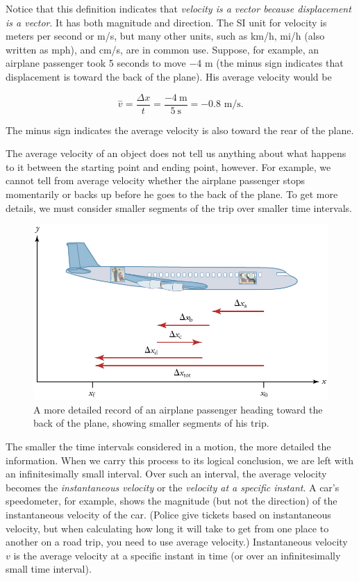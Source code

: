 \documentclass[
]{book}
\begin{document}
Notice that this definition indicates that \emph{velocity is a vector because
displacement is a vector}. It has both magnitude and direction. The SI
unit for velocity is meters per second or m/s, but many other units,
such as km/h, mi/h (also written as mph), and cm/s, are in common use.
Suppose, for example, an airplane passenger took 5 seconds to move −4 m
(the minus sign indicates that displacement is toward the back of the
plane). His average velocity would be

\leavevmode\hypertarget{import-auto-id4051374}{}%
\[{{{\overset{-}{v} = \frac{\Delta x}{t}} = \frac{- 4\ \text{m}}{5\ \text{s}}} = - \text{0.8\ m/s.}}{}\]

The minus sign indicates the average velocity is also toward the rear of
the plane.

The average velocity of an object does not tell us anything about what
happens to it between the starting point and ending point, however. For
example, we cannot tell from average velocity whether the airplane
passenger stops momentarily or backs up before he goes to the back of
the plane. To get more details, we must consider smaller segments of the
trip over smaller time intervals.

\begin{figure}
\hypertarget{import-auto-id1782958}{%
\centering
\includegraphics{images/Figure_02_02_01.jpg}
\caption{A more detailed record of an airplane passenger heading toward the
back of the plane, showing smaller segments of his
trip.}\label{import-auto-id1782958}
}
\end{figure}

The smaller the time intervals considered in a motion, the more detailed
the information. When we carry this process to its logical conclusion,
we are left with an infinitesimally small interval. Over such an
interval, the average velocity becomes the \emph{instantaneous velocity}
\emph{}or the \emph{velocity at a specific instant}.
A car's speedometer, for example, shows the magnitude (but not the
direction) of the instantaneous velocity of the car. (Police give
tickets based on instantaneous velocity, but when calculating how long
it will take to get from one place to another on a road trip, you need
to use average velocity.) \protect\hypertarget{import-auto-id2579029}{}{Instantaneous
velocity} \(v{}\) is the average
velocity at a specific instant in time (or over an infinitesimally small
time interval).
\end{document}

